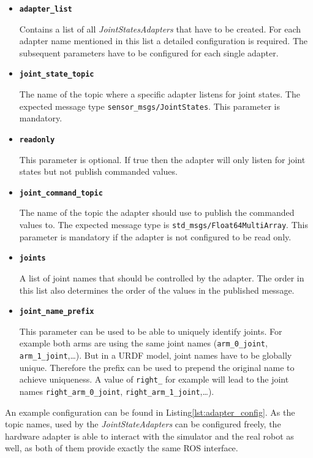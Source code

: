 \begin{itemize}

\item \textbf{\texttt{adapter\_list}} \

Contains a list of all \emph{JointStatesAdapters} that have to be created. For each adapter name mentioned in this list a detailed configuration is required. The subsequent parameters have to be configured for each single adapter.

\item \textbf{\texttt{joint\_state\_topic}} \

The name of the topic where a specific adapter listens for joint states. The expected message type  \texttt{sensor\_msgs/JointStates}. This parameter is mandatory.

\item \textbf{\texttt{readonly}} \

This parameter is optional. If true then the adapter will only listen for joint states but not publish commanded values.

\item \textbf{\texttt{joint\_command\_topic}} \

The name of the topic the adapter should use to publish the commanded values to. The expected message type is \texttt{std\_msgs/Float64MultiArray}. This parameter is mandatory if the adapter is not configured to be read only.

\item \textbf{\texttt{joints}} \

A list of joint names that should be controlled by the adapter. The order in this list also determines the order of the values in the published message.

\item \textbf{\texttt{joint\_name\_prefix}} \

This parameter can be used to be able to uniquely identify joints. For example both arms are using the same joint names (\texttt{arm\_0\_joint}, \texttt{arm\_1\_joint},\ldots). But in a URDF model,  joint names have to be globally unique. Therefore the prefix can be used to prepend the original name to achieve uniqueness. A value of \texttt{right\_} for example will lead to the joint names \texttt{right\_arm\_0\_joint}, \texttt{right\_arm\_1\_joint},\ldots).

\end{itemize}

An example configuration can be found in Listing\ref{lst:adapter_config}. As the topic names, used by the \emph{JointStateAdapters} can be configured freely, the hardware adapter is able to interact with the simulator and the real robot as well, as both of them provide exactly the same ROS interface.

